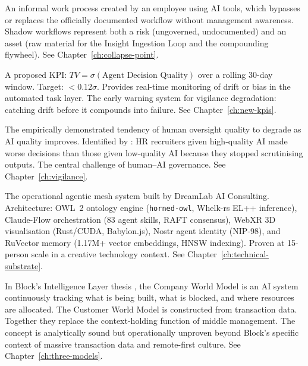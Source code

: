 \begin{description}[style=nextline, leftmargin=2em, font=\bfseries\color{navyblue}]
\item[Shadow Workflow]
An informal work process created by an employee using AI tools, which bypasses or replaces the officially documented workflow without management awareness. Shadow workflows represent both a risk (ungoverned, undocumented) and an asset (raw material for the Insight Ingestion Loop and the compounding flywheel). See Chapter~\ref{ch:collapse-point}.

\item[Trust Variance (TV)]
A proposed KPI: $TV = \sigma(\text{Agent Decision Quality})$ over a rolling 30-day window. Target: $<0.12\sigma$. Provides real-time monitoring of drift or bias in the automated task layer. The early warning system for vigilance degradation: catching drift before it compounds into failure. See Chapter~\ref{ch:new-kpis}.

\item[Vigilance Problem]
The empirically demonstrated tendency of human oversight quality to degrade as AI quality improves. Identified by \textcite{DellAcqua2023}: HR recruiters given high-quality AI made worse decisions than those given low-quality AI because they stopped scrutinising outputs. The central challenge of human--AI governance. See Chapter~\ref{ch:vigilance}.

\item[VisionClaw]
The operational agentic mesh system built by DreamLab AI Consulting. Architecture: OWL~2 ontology engine (\texttt{horned-owl}, Whelk-rs EL++ inference), Claude-Flow orchestration (83 agent skills, RAFT consensus), WebXR 3D visualisation (Rust/CUDA, Babylon.js), Nostr agent identity (NIP-98), and RuVector memory (1.17M+ vector embeddings, HNSW indexing). Proven at 15-person scale in a creative technology context. See Chapter~\ref{ch:technical-substrate}.

\item[World Model]
In Block's Intelligence Layer thesis \parencite{DorseyBotha2026}, the Company World Model is an AI system continuously tracking what is being built, what is blocked, and where resources are allocated. The Customer World Model is constructed from transaction data. Together they replace the context-holding function of middle management. The concept is analytically sound but operationally unproven beyond Block's specific context of massive transaction data and remote-first culture. See Chapter~\ref{ch:three-models}.

\end{description}
